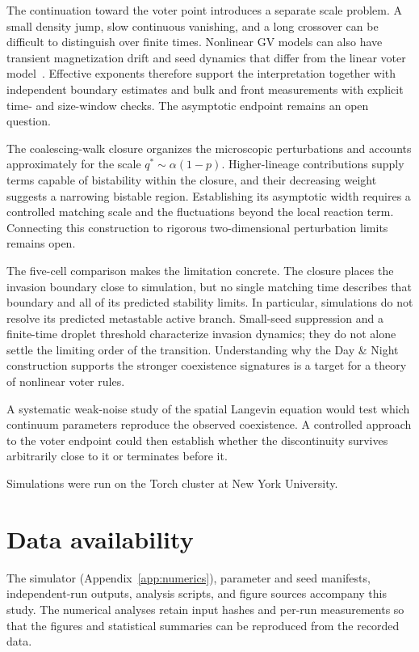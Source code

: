 \documentclass[pre,twocolumn,superscriptaddress,showpacs,floatfix]{revtex4-2}
\begin{document}
The continuation toward the voter point introduces a separate scale problem.
A small density jump, slow continuous vanishing, and a long crossover can be difficult
to distinguish over finite times. Nonlinear GV models can also have transient
magnetization drift and seed dynamics that differ from the linear voter
model~\cite{castellano2012,azizi2020}. Effective exponents therefore support the
interpretation together with independent boundary estimates and bulk and front
measurements with explicit time- and size-window checks. The asymptotic
endpoint remains an open question.

The coalescing-walk closure organizes the microscopic perturbations and accounts
approximately for the scale $q^*\sim\alpha(1-p)$. Higher-lineage contributions supply
terms capable of bistability within the closure, and their decreasing weight suggests
a narrowing bistable region. Establishing its asymptotic width requires a controlled
matching scale and the fluctuations beyond the local reaction term. Connecting this
construction to rigorous two-dimensional perturbation limits~\cite{cox2010,cox2025}
remains open.

The five-cell comparison makes the limitation concrete. The closure places the invasion
boundary close to simulation, but no single matching time describes that boundary and
all of its predicted stability limits. In particular, simulations do not resolve its
predicted metastable active branch. Small-seed suppression and a finite-time droplet
threshold characterize invasion dynamics; they do not alone settle the limiting order
of the transition. Understanding why the Day \& Night construction supports the
stronger coexistence signatures is a target for a theory of nonlinear voter rules.

A systematic weak-noise study of the spatial Langevin equation would test which
continuum parameters reproduce the observed coexistence. A controlled approach to the
voter endpoint could then establish whether the discontinuity survives arbitrarily
close to it or terminates before it.

\begin{acknowledgments}
Simulations were run on the Torch cluster at New York University.
\end{acknowledgments}

\section*{Data availability}
The simulator (Appendix~\ref{app:numerics}), parameter and seed manifests,
independent-run outputs, analysis scripts, and figure sources accompany this study.
The numerical analyses retain input hashes and per-run measurements so that the
figures and statistical summaries can be reproduced from the recorded data.
\end{document}
